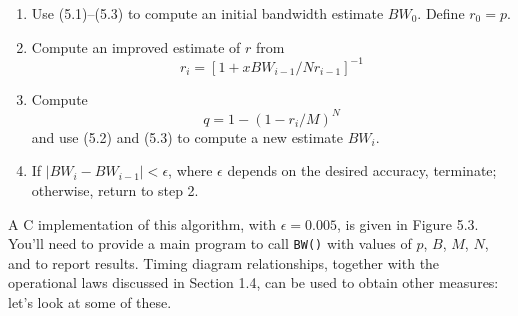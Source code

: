 \begin{enumerate}
\item Use (5.1)--(5.3) to compute an initial bandwidth estimate
$BW_0$. Define $r_0=p$.
\item Compute an improved estimate of $r$ from
\begin{equation}
r_i=[1+xBW_{i-1}/Nr_{i-1}]^{-1}
\end{equation}
\item Compute
\begin{equation}
q=1-(1-r_i/M)^N
\end{equation}
and use (5.2) and (5.3) to compute a new estimate $BW_i$.
\item If $|BW_i-BW_{i-1}|<\epsilon$, where $\epsilon$ depends on the desired
accuracy, terminate; otherwise, return to step 2.
\end{enumerate}

A C implementation of this algorithm, with $\epsilon=0.005$, is given in Figure 5.3.
You'll need to provide a main program to call \texttt{BW()} with values of $p$, $B$, $M$, $N$,
and to report results. Timing diagram relationships, together with the
operational laws discussed in Section 1.4, can be used to obtain other
measures: let's look at some of these.



